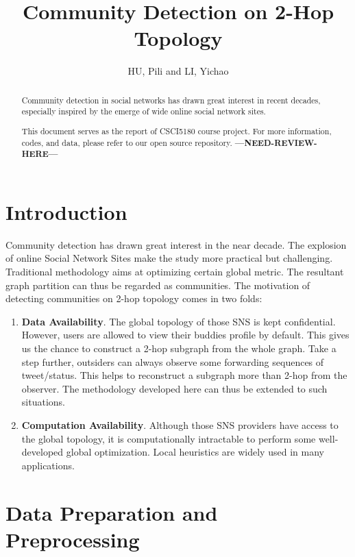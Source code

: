 \documentclass[11pt,a4paper]{article}
\author{HU, Pili and LI, Yichao}
\title{Community Detection on 2-Hop Topology}
\newcommand{\question}{\textbf{---NEED-REVIEW-HERE---}}
\begin{document}
\maketitle

\begin{abstract}
	Community detection in social networks has drawn great interest
	in recent decades, especially inspired by the emerge of wide 
	online social network sites. 

	This document serves as the report of CSCI5180 course 
	project\cite{csci5180_lecture,csci5180_tutorial}. 
	For more information, codes, and data, please refer to 
	our open source repository\cite{hu2011-cd2hop}. 
	 \question
\end{abstract}

\pagebreak
\tableofcontents
\pagebreak

\section{Introduction}

Community detection has drawn great interest in the near decade. 
The explosion of online Social Network Sites make the study more 
practical but challenging. Traditional methodology aims at 
optimizing certain global metric. The resultant graph partition 
can thus be regarded as communities. The motivation of detecting 
communities on 2-hop topology comes in two folds: 
\begin{enumerate}
	\item \textbf{Data Availability}. The global topology of 
	those SNS is kept confidential. However, users are allowed 
	to view their buddies profile by default. This gives us the 
	chance to construct a 2-hop subgraph from the whole graph. 
	Take a step further, outsiders can always observe some forwarding 
	sequences of tweet/status. This helps to reconstruct a 
	subgraph more than 2-hop from the observer. The methodology 
	developed here can thus be extended to such situations. 
	\item \textbf{Computation Availability}. Although those SNS 
	providers have access to the global topology, it is computationally
	intractable to perform some well-developed global optimization. 
	Local heuristics are widely used in many applications. 
\end{enumerate}

\section{Data Preparation and Preprocessing}
\end{document}
